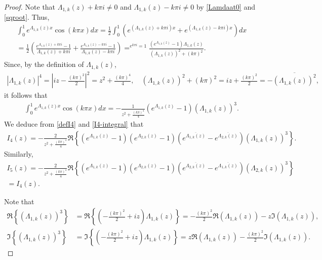 \documentclass[10pt,a4paper]{amsart}
\begin{document}
\begin{proof} Note that $\Lambda_{1,k}(z) + k \pi i \neq 0$ and $\Lambda_{1,k}(z) - k \pi i \neq 0$ by \eqref{Lamdaat0} and \eqref{sqroot}. Thus,
    \begin{multline*}
        \int_0^1 e^{\Lambda_{1,k}(z) x} \cos(k \pi x)  dx = \frac{1}{2} \int_0^1 \left(e^{(\Lambda_{1,k}(z) + k \pi i) x} + e^{(\Lambda_{1,k}(z) - k \pi i) x} \right) dx  \\
        = \frac{1}{2} \left(\frac{e^{\Lambda_{1,k}(z) + k \pi i} - 1}{\Lambda_{1,k}(z) + k \pi i} + \frac{e^{\Lambda_{1,k}(z) - k \pi i} - 1}{\Lambda_{1,k}(z) - k \pi i} \right) \mathop{=}^{e^{k \pi i} = 1} \frac{\left(e^{\Lambda_{1,k}(z)} - 1 \right) \Lambda_{1,k}(z) }{(\Lambda_{1,k}(z))^2 + (k \pi)^2}. 
    \end{multline*}
    Since, by the definition of $\Lambda_{1,k}(z)$, 
    \begin{align*}
   |\Lambda_{1,k}(z)|^4 = \left|iz - \frac{(k \pi)^2}{2} \right|^2 = z^2 + \frac{(k \pi)^4}{4}, \quad      (\Lambda_{1,k}(z))^2 + (k \pi)^2 = iz + \frac{(k \pi)^2}{2} = - \overline{(\Lambda_{1,k}(z))^2},  
    \end{align*}
it follows that    
\begin{align}	\label{I4-integral}
    	\int_0^1 e^{\Lambda_{1,k}(z) x} \cos(k \pi x) dx = - \frac{1}{z^2 + \frac{(k \pi)^4}{4}} \left(e^{\Lambda_{1,k}(z)} - 1 \right) \left(\Lambda_{1,k}(z) \right)^3.  
    \end{align}
    We deduce from \eqref{defI4} and \eqref{I4-integral} that 
    \begin{align}
        I_4(z) = - \frac{ 2}{z^2 + \frac{(k \pi)^4}{4}}\Re \left\{  \left(e^{\Lambda_{1,k}(z)} - 1 \right) \left(e^{\Lambda_{2,k}(z)} - 1 \right) \left(e^{\overline{\Lambda_{1,k}(z)}} - e^{\overline{\Lambda_{2,k}(z)}} \right) \left(\Lambda_{1,k}(z) \right)^3 \right\}. 	\label{I4-step1}
    \end{align}
    Similarly,
    \begin{multline}  	\label{I5-step1}
        I_5(z) = -\frac{ 2}{z^2 + \frac{(k \pi)^4}{4}}\Re \left\{ \left(e^{\Lambda_{1,k}(z)} - 1 \right)  \left(e^{\Lambda_{2,k}(z)} - 1 \right)\left(e^{\overline{\Lambda_{2,k}(z)}} - e^{\overline{\Lambda_{1,k}(z)}} \right) \left(\Lambda_{2,k}(z) \right)^3 \right\}  \\ 
        = I_4(z).
    \end{multline}  

  	Note that 
    \begin{align}
       \Re \left\{ \left(\Lambda_{1,k}(z) \right)^3 \right\} &= \Re \left\{\left(-\frac{(k \pi)^2}{2} + iz \right) \Lambda_{1,k}(z) \right\} = - \frac{(k \pi)^2}{2}\Re (\Lambda_{1,k}(z)) - z \Im (\Lambda_{1,k}(z)), \label{I4-step3.1}\\
        \Im \left\{ \left(\Lambda_{1,k}(z) \right)^3 \right\} &=  \Im \left\{\left(-\frac{(k \pi)^2}{2} + iz \right) \Lambda_{1,k}(z) \right\} = z\Re (\Lambda_{1,k}(z)) - \frac{(k \pi)^2}{2} \Im (\Lambda_{1,k}(z)). 	\label{I4-step3.2}
    \end{align}
        

\end{proof}
\end{document}
